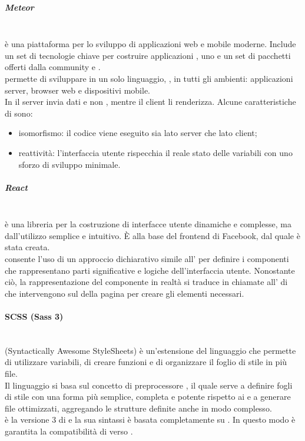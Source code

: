 \subparagraph{Meteor}\mbox{}\\
 è una piattaforma   per lo sviluppo di applicazioni web e mobile moderne. Include un set di tecnologie chiave per costruire applicazioni , uno  e un set di pacchetti offerti dalla community  e .\\
 permette di sviluppare in un solo linguaggio, , in tutti gli ambienti: applicazioni server, browser web e dispositivi mobile.\\
In  il server invia dati e non , mentre il client li renderizza.
Alcune caratteristiche di  sono:
\begin{itemize}
	\item isomorfismo: il codice viene eseguito sia lato server che lato client;
	\item reattività: l'interfaccia utente rispecchia il reale stato delle variabili con uno sforzo di sviluppo minimale.
\end{itemize}

\subparagraph{React}\mbox{}\\
 è una libreria  per la costruzione di interfacce utente dinamiche e complesse, ma dall'utilizzo semplice e intuitivo. \`{E} alla base del frontend di Facebook, dal quale è stata creata.\\
 consente l'uso di un approccio dichiarativo simile all' per definire i componenti che rappresentano parti significative e logiche dell'interfaccia utente. Nonostante ciò, la rappresentazione del componente in realtà si traduce in chiamate all' di  che intervengono sul  della pagina per creare gli elementi necessari.

\paragraph{SCSS (Sass 3)}\mbox{}\\
 (Syntactically Awesome StyleSheets) è un'estensione del linguaggio  che permette di utilizzare variabili, di creare funzioni e di organizzare il foglio di stile in più file.\\
Il linguaggio  si basa sul concetto di preprocessore , il quale serve a definire fogli di stile con una forma più semplice, completa e potente rispetto ai  e a generare file  ottimizzati, aggregando le strutture definite anche in modo complesso.\\
 è la versione 3 di  e la sua sintassi è basata completamente su . In questo modo è garantita la compatibilità di  verso .

